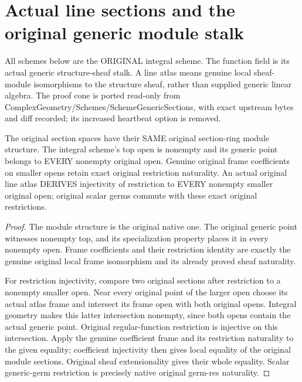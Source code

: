 \section{Actual line sections and the original generic module stalk}
\label{sec:canonical-generic-line-sections}

All schemes below are the ORIGINAL integral scheme. The function field
is its actual generic structure-sheaf stalk. A line atlas means genuine
local sheaf-module isomorphisms to the structure sheaf, rather than
supplied generic linear algebra. The proof cone is ported read-only from
ComplexGeometry/Schemes/SchemeGenericSections, with exact upstream bytes and diff
recorded; its increased heartbeat option is removed.

\begin{theorem}
\label{sc0-generic-line:original-restriction}
\leanok
The original section spaces have their SAME original section-ring module
structure. The integral scheme's top open is nonempty and its generic
point belongs to EVERY nonempty original open. Genuine original frame
coefficients on smaller opens retain exact original restriction
naturality. An actual original line atlas DERIVES injectivity of
restriction to EVERY nonempty smaller original open; original scalar
germs commute with these exact original restrictions.
\end{theorem}
\begin{proof}
The module structure is the original native one. The original generic
point witnesses nonempty top, and its specialization property places
it in every nonempty open. Frame coefficients and their restriction
identity are exactly the genuine original local frame isomorphism and
its already proved sheaf naturality.

For restriction injectivity, compare two original sections after
restriction to a nonempty smaller open. Near every original point of
the larger open choose its actual atlas frame and intersect its frame
open with both original opens. Integral geometry makes this latter
intersection nonempty, since both opens contain the actual generic
point. Original regular-function restriction is injective on this
intersection. Apply the genuine coefficient frame and its restriction
naturality to the given equality; coefficient injectivity then gives
local equality of the original module sections. Original sheaf
extensionality gives their whole equality. Scalar generic-germ
restriction is precisely native original germ-res naturality.
\end{proof}

